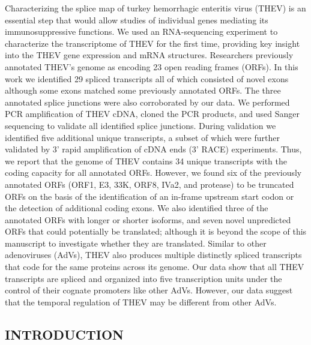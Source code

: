\documentclass[
]{article}
\begin{document}
Characterizing the splice map of turkey hemorrhagic enteritis virus
(THEV) is an essential step that would allow studies of individual genes
mediating its immunosuppressive functions. We used an RNA-sequencing
experiment to characterize the transcriptome of THEV for the first time,
providing key insight into the THEV gene expression and mRNA structures.
Researchers previously annotated THEV's genome as encoding 23 open
reading frames (ORFs). In this work we identified 29 spliced transcripts
all of which consisted of novel exons although some exons matched some
previously annotated ORFs. The three annotated splice junctions were
also corroborated by our data. We performed PCR amplification of THEV
cDNA, cloned the PCR products, and used Sanger sequencing to validate
all identified splice junctions. During validation we identified five
additional unique transcripts, a subset of which were further validated
by 3' rapid amplification of cDNA ends (3' RACE) experiments. Thus, we
report that the genome of THEV contains 34 unique transcripts with the
coding capacity for all annotated ORFs. However, we found six of the
previously annotated ORFs (ORF1, E3, 33K, ORF8, IVa2, and protease) to
be truncated ORFs on the basis of the identification of an in-frame
upstream start codon or the detection of additional coding exons. We
also identified three of the annotated ORFs with longer or shorter
isoforms, and seven novel unpredicted ORFs that could potentially be
translated; although it is beyond the scope of this manuscript to
investigate whether they are translated. Similar to other adenoviruses
(AdVs), THEV also produces multiple distinctly spliced transcripts that
code for the same proteins across its genome. Our data show that all
THEV transcripts are spliced and organized into five transcription units
under the control of their cognate promoters like other AdVs. However,
our data suggest that the temporal regulation of THEV may be different
from other AdVs. \newpage

\subsection{INTRODUCTION}\label{introduction}
\end{document}
